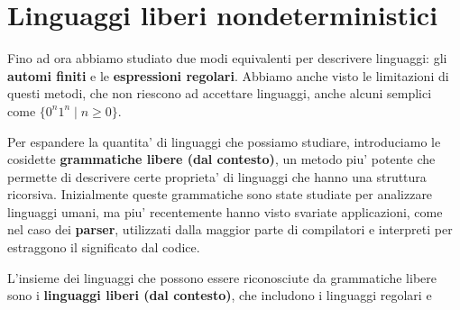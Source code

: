 \chapter{Linguaggi liberi nondeterministici}
Fino ad ora abbiamo studiato due modi equivalenti per descrivere linguaggi: gli \textbf{automi finiti} e le \textbf{espressioni regolari}. Abbiamo anche visto le limitazioni di questi metodi, che non riescono ad accettare linguaggi, anche alcuni semplici come $ \{0^n 1^n \mid n \geq 0\} $. 

Per espandere la quantita' di linguaggi che possiamo studiare, introduciamo le cosidette \textbf{grammatiche libere (dal contesto)}, un metodo piu' potente che permette di descrivere certe proprieta' di linguaggi che hanno una struttura ricorsiva. Inizialmente queste grammatiche sono state studiate per analizzare linguaggi umani, ma piu' recentemente hanno visto svariate applicazioni, come nel caso dei \textbf{parser}, utilizzati dalla maggior parte di compilatori e interpreti per estraggono il significato dal codice. 

L'insieme dei linguaggi che possono essere riconosciute da grammatiche libere sono i \textbf{linguaggi liberi (dal contesto)}, che includono i linguaggi regolari e 
